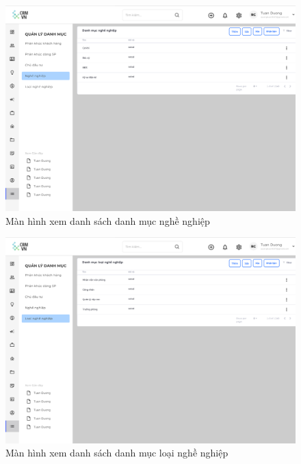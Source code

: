 \documentclass[12pt,a4paper]{article}
\begin{document}
\begin{enumerate}
\begin{itemize}
            \begin{figure}[H]
                \centering \includegraphics[width=\textwidth]{Img/Nguyet/Danhmuc/dsnghenghiep.png}
                \vspace{0.5cm}
                \caption{Màn hình xem danh sách danh mục nghề nghiệp }
                \label{dmnn}
            \end{figure}

            \begin{figure}[H]
                \centering \includegraphics[width=\textwidth]{Img/Nguyet/Danhmuc/loainghenghiep.png}
                \vspace{0.5cm}
                \caption{Màn hình xem danh sách danh mục loại nghề nghiệp}
                \label{lnn}
            \end{figure}



\end{itemize}
\end{enumerate}
\end{document}
